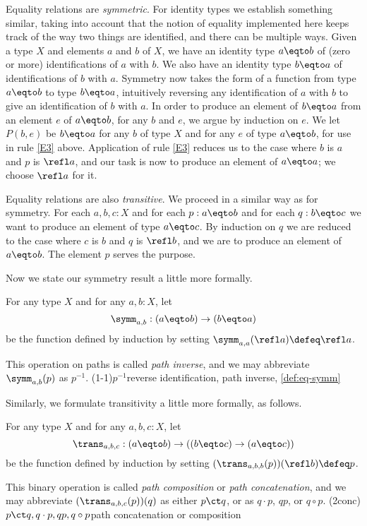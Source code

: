 Equality relations are \emph{symmetric}. For identity types
we establish something similar, taking into account that
the notion of equality implemented here keeps track of the way
two things are identified, and there can be multiple ways.
Given a type $X$ and elements $a$ and $b$ of $X$,
we have an identity type $a \eqto b$
of (zero or more) identifications of $a$ with $b$. We also have
an identity type $b \eqto a$ of identifications of $b$ with $a$.
Symmetry now takes the form of a function from
type $a \eqto b$ to type $b \eqto a$, intuitively reversing
any identification of $a$ with $b$
to give an identification of $b$ with $a$.
In order to produce an element of $b \eqto a$ from an element $e$
of $a \eqto b$, for any $b$ and $e$, we argue by induction on $e$.
We let $P(b,e)$ be $b \eqto a$ for any $b$ of type $X$ and for
any $e$ of type $a \eqto b$, for use in rule \ref{E3} above.
Application of rule \ref{E3} reduces us to the case where $b$ is
$a$ and $p$ is $\refl a$, and our task is now to produce an
element of $a \eqto a$; we choose $\refl a$ for it.

Equality relations are also \emph{transitive}. We proceed in a
similar way as for symmetry. For each $a,b,c:X$ and for each
$p:a \eqto b$ and for each $q:b \eqto c$ we want to produce an
element of type $a \eqto c$.  By induction on $q$ we are reduced
to the case where $c$ is $b$ and $q$ is $\refl b$,
and we are to produce an element of $a \eqto b$.
The element $p$ serves the purpose.

Now we state our symmetry result a little more formally.

\begin{definition}\label{def:eq-symm}
  For any type $X$ and for any $a,b:X$, let
  $$\symm_{a,b} : (a \eqto b) \to (b \eqto a)$$
  be the function defined by induction by setting
  $\symm_{a,a}(\refl a) \defeq \refl a$.

  This operation on paths is called \emph{path inverse}, and we may abbreviate $\symm_{a,b}(p)$ as $p^{-1}$.
  \glossary(1-1){$p^{-1}$}{reverse identification, path inverse, \cref{def:eq-symm}}
\end{definition}

Similarly, we formulate transitivity a little more formally, as follows.

\begin{definition}\label{def:eq-trans}
  For any type $X$ and for any $a,b,c:X$, let $$\trans_{a,b,c} : (a \eqto b) \to ((b \eqto c) \to (a \eqto c))$$ be the function defined by induction by setting
  $(\trans_{a,b,b} (p)) (\refl b ) \defeq p$.

  This binary operation is called \emph{path composition} or \emph{path concatenation},
  and we may abbreviate $(\trans_{a,b,c}(p))(q)$ as either $p \ct q$, or as $q \cdot p$, $qp$, or $q \circ p$.
  \glossary(2conc){$p\protect\ct q, q\cdot p, qp, q\circ p$}{path concatenation or composition}
\end{definition}

